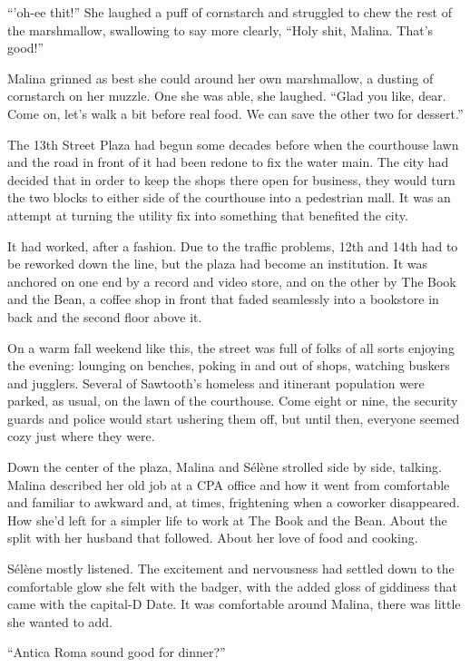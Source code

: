 ``'oh-ee thit!'' She laughed a puff of cornstarch and struggled to chew the rest of the marshmallow, swallowing to say more clearly, ``Holy shit, Malina. That's good!''

Malina grinned as best she could around her own marshmallow, a dusting of cornstarch on her muzzle. One she was able, she laughed. ``Glad you like, dear. Come on, let's walk a bit before real food. We can save the other two for dessert.''

The 13th Street Plaza had begun some decades before when the courthouse lawn and the road in front of it had been redone to fix the water main. The city had decided that in order to keep the shops there open for business, they would turn the two blocks to either side of the courthouse into a pedestrian mall. It was an attempt at turning the utility fix into something that benefited the city.

It had worked, after a fashion. Due to the traffic problems, 12th and 14th had to be reworked down the line, but the plaza had become an institution. It was anchored on one end by a record and video store, and on the other by The Book and the Bean, a coffee shop in front that faded seamlessly into a bookstore in back and the second floor above it.

On a warm fall weekend like this, the street was full of folks of all sorts enjoying the evening: lounging on benches, poking in and out of shops, watching buskers and jugglers. Several of Sawtooth's homeless and itinerant population were parked, as usual, on the lawn of the courthouse. Come eight or nine, the security guards and police would start ushering them off, but until then, everyone seemed cozy just where they were.

Down the center of the plaza, Malina and Sélène strolled side by side, talking. Malina described her old job at a CPA office and how it went from comfortable and familiar to awkward and, at times, frightening when a coworker disappeared. How she'd left for a simpler life to work at The Book and the Bean. About the split with her husband that followed. About her love of food and cooking.

Sélène mostly listened. The excitement and nervousness had settled down to the comfortable glow she felt with the badger, with the added gloss of giddiness that came with the capital-D Date. It was comfortable around Malina, there was little she wanted to add.

``Antica Roma sound good for dinner?''

